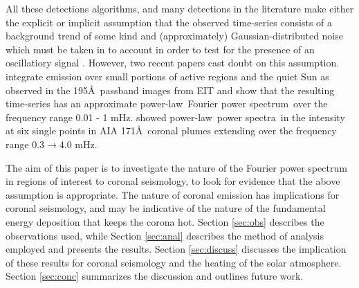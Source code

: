 \documentclass[onecolumn]{emulateapj}
\newcommand{\PS}{power spectrum}
\newcommand{\PA}{power spectra}
\newcommand{\PL}{power-law}
\newcommand{\Fps}{Fourier \PS}
\newcommand{\BF}{ }
\begin{document}
All these detections algorithms, and many detections in the literature
make either the explicit or implicit assumption that the observed
time-series consists of a background trend of some kind and
(approximately) Gaussian-distributed noise which must be taken in to
account in order to test for the presence of an oscillatiory signal
{\BF \citep{2004SoPh..223....1D, 2007SoPh..241..397N,
    2008SoPh..248..395S, 2010SoPh..264..403I, 2013SoPh..286..405C}.}
{\BF However, two recent papers cast doubt on this assumption.
  \cite{2014AA...563A...8A} integrate emission over small portions of
  active regions and the quiet Sun as observed in the 195\AA\ passband
  images from EIT and show that the resulting time-series has an
  approximate \PL\ \Fps\ over the frequency range 0.01 - 1 mHz.
  \citet{gupta2014} showed \PL\ \PA\ in the intensity at six single
  points in AIA 171\AA\ coronal plumes extending over the frequency range
  $0.3\rightarrow 4.0$ mHz.}

{\BF The aim of this paper is to investigate the nature of the Fourier
  power spectrum in regions of interest to coronal seismology, to look
  for evidence that the above assumption is appropriate.}  The nature
of coronal emission has implications for coronal seismology, and may
be indicative of the nature of the fundamental energy deposition that
keeps the corona hot.  Section \ref{sec:obs} describes the
observations used, while Section \ref{sec:anal} describes the method
of analysis employed and presents the results.  Section
\ref{sec:discuss} discusses the implication of these results for
coronal seismology and the heating of the solar atmosphere.  Section
\ref{sec:conc} summarizes the discussion and outlines future work.
\end{document}
